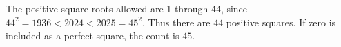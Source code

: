 The positive square roots allowed are 1 through 44, since $44^2=1936<2024<2025=45^2$. Thus there are $\boxed{44}$ positive squares. If zero is included as a perfect square, the count is $\boxed{45}$.
